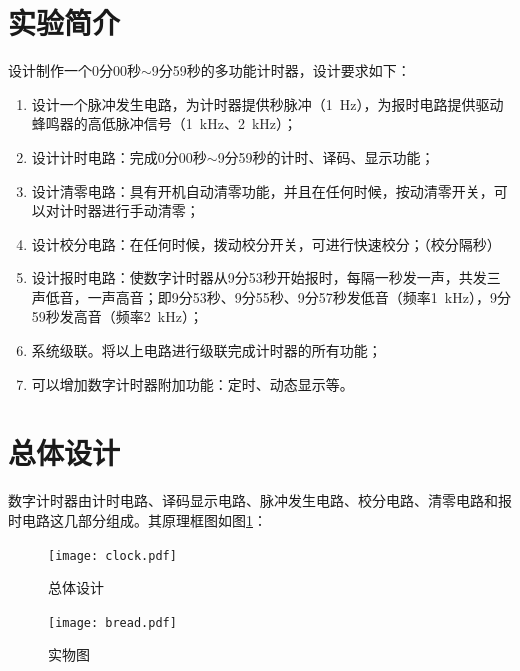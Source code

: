 \documentclass{article}
\begin{document}


\tableofcontents
\listoffigures
\listoftables
\setcounter{section}{-1}


\newpage

\section{实验简介}%
\label{sec:实验简介}

设计制作一个0分00秒$ \sim $9分59秒的多功能计时器，设计要求如下： \cite{electron}

\begin{enumerate}
	\item 设计一个脉冲发生电路，为计时器提供秒脉冲（\SI{1}{Hz}），为报时电路提供驱动蜂鸣器的高低脉冲信号（\SI{1}{kHz}、\SI{2}{kHz}）；
	\item 设计计时电路：完成0分00秒$ \sim $9分59秒的计时、译码、显示功能；
	\item 设计清零电路：具有开机自动清零功能，并且在任何时候，按动清零开关，可以对计时器进行手动清零；
	\item 设计校分电路：在任何时候，拨动校分开关，可进行快速校分；（校分隔秒）
	\item 设计报时电路：使数字计时器从9分53秒开始报时，每隔一秒发一声，共发三声低音，一声高音；即9分53秒、9分55秒、9分57秒发低音（频率\SI{1}{kHz}），9分59秒发高音（频率\SI{2}{kHz}）；
	\item 系统级联。将以上电路进行级联完成计时器的所有功能；
	\item 可以增加数字计时器附加功能：定时、动态显示等。
\end{enumerate}

\section{总体设计}%
\label{sec:总体设计}

数字计时器由计时电路、译码显示电路、脉冲发生电路、校分电路、清零电路和报时电路这几部分组成。其原理框图如图\ref{fig:总体设计}： \cite{circuit}

\begin{figure}[htpb]
	\centering
	\texttt{[image: clock.pdf]}
	\caption{总体设计}
	\label{fig:总体设计}
\end{figure}

\begin{figure}[htpb]
	\centering
	\texttt{[image: bread.pdf]}
	\caption{实物图}
	\label{fig:实物图}
\end{figure}
\end{document}
